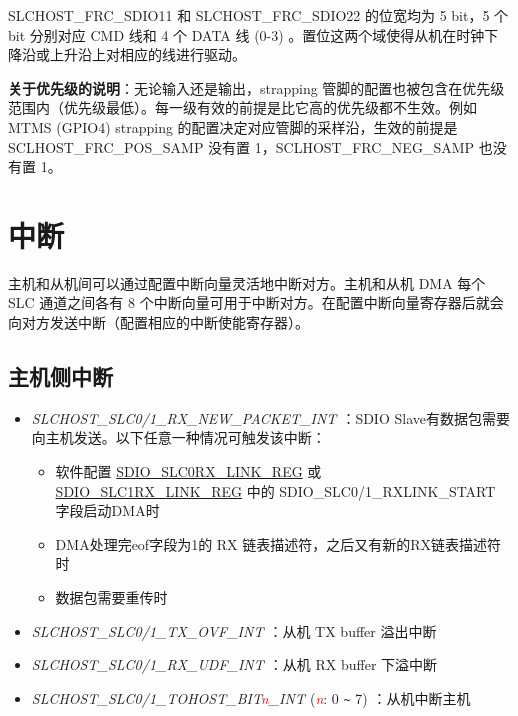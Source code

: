 \documentclass[main\_\_CN.tex]{subfiles}
\begin{document}
SLCHOST\_FRC\_SDIO11 和 SLCHOST\_FRC\_SDIO22 的位宽均为 5 bit，5 个 bit 分别对应 CMD 线和 4 个 DATA 线 (0-3) 。置位这两个域使得从机在时钟下降沿或上升沿上对相应的线进行驱动。

\textbf{关于优先级的说明}：无论输入还是输出，strapping 管脚的配置也被包含在优先级范围内（优先级最低）。每一级有效的前提是比它高的优先级都不生效。例如 MTMS (GPIO4) strapping 的配置决定对应管脚的采样沿，生效的前提是 SCLHOST\_FRC\_POS\_SAMP 没有置 1，SCLHOST\_FRC\_NEG\_SAMP 也没有置 1。

\section{中断}

主机和从机间可以通过配置中断向量灵活地中断对方。主机和从机 DMA 每个 SLC 通道之间各有 8 个中断向量可用于中断对方。在配置中断向量寄存器后就会向对方发送中断（配置相应的中断使能寄存器）。

\subsection{主机侧中断}
\begin{itemize}
\item {\it SLCHOST\_SLC0/1\_RX\_NEW\_PACKET\_INT \label{int:SLCHOSTSLC01RXNEWPACKETINT}}：SDIO Slave有数据包需要向主机发送。以下任意一种情况可触发该中断：
    \begin{itemize}
        \item 软件配置 \hyperref[regdesc:SDIOSLC0RXLINKREG]{SDIO\_SLC0RX\_LINK\_REG} 或 \hyperref[regdesc:SDIOSLC1RXLINKREG]{SDIO\_SLC1RX\_LINK\_REG} 中的 SDIO\_SLC0/1\_RXLINK\_START 字段启动DMA时
        \item DMA处理完eof字段为1的 RX 链表描述符，之后又有新的RX链表描述符时
        \item 数据包需要重传时
    \end{itemize}
\item {\it SLCHOST\_SLC0/1\_TX\_OVF\_INT \label{int:SLCHOSTSLC01TXOVFINT}}：从机 TX buffer 溢出中断
\item {\it SLCHOST\_SLC0/1\_RX\_UDF\_INT \label{int:SLCHOSTSLC01RXUDFINT}}：从机 RX buffer 下溢中断
\item {\it SLCHOST\_SLC0/1\_TOHOST\_BIT\textcolor{red}{\it{n}}\_INT \label{int:SLCHOSTSLC01TOHOSTBITnINT}} (\textcolor{red}{\it{n}}: 0 \verb+~+ 7) ：从机中断主机
\end{itemize}
\end{document}
